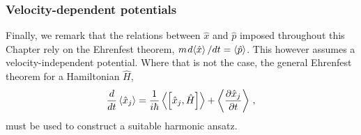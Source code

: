 \subsubsection{Velocity-dependent potentials}

Finally, we remark that the relations between $\hat{x}$ and $\hat{p}$ imposed throughout this Chapter rely on the Ehrenfest theorem, $m \hspace*{0.3mm} d \hspace*{-0.6mm} \expval{\hat{x}} / dt = \expval{\hat{p}}$. This however assumes a velocity-independent potential. Where that is not the case, the general Ehrenfest theorem for a Hamiltonian $\hat{H}$,
\begin{equation}
\frac{d }{dt} \expval{\hat{x}_j}= \frac{1}{i \hbar} \expval{\left[\hat{x}_j, \hat{H} \right]} + \expval{\frac{\partial \hat{x}_j}{\partial t}}\,,
\end{equation}
must be used to construct a suitable harmonic ansatz. 